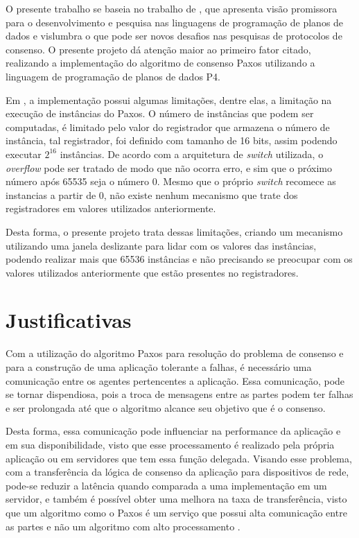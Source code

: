 \documentclass[
    12pt,
    openright, 
    oneside,
    a4paper,
    french,
    english,
    brazil
    ]{facom-ufu-abntex2}
\theoremstyle{definition}
\begin{document}
O presente trabalho se baseia no trabalho de \cite{dang2016paxos}, que apresenta visão
promissora para o desenvolvimento e pesquisa nas linguagens de programação de planos de dados 
e vislumbra o que pode ser novos desafios nas pesquisas de protocolos de consenso.
O presente projeto dá atenção maior ao primeiro fator citado, realizando a implementação do algoritmo de consenso Paxos utilizando 
a linguagem de programação de planos de dados P4. 

Em \cite{dang2016paxos}, a implementação possui algumas limitações, dentre elas, a limitação na execução de instâncias do Paxos. 
O número de instâncias que podem ser computadas, é limitado pelo valor do registrador que armazena o número de instância, tal registrador, 
foi definido com tamanho de 16 bits, assim podendo executar $2^{16}$ instâncias. De acordo com a arquitetura de \emph{switch} utilizada, 
o \emph{overflow} pode ser tratado de modo que não ocorra erro, e sim que o próximo número após 65535 seja o número 0. 
Mesmo que o próprio \emph{switch} recomece as instancias a partir de 0, não existe nenhum mecanismo que trate dos registradores em 
valores utilizados anteriormente. 

Desta forma, o presente projeto trata dessas limitações, criando um mecanismo utilizando uma
janela deslizante para lidar com os valores das instâncias, podendo realizar mais que
65536 instâncias e não precisando se preocupar com os valores utilizados anteriormente
que estão presentes no registradores.

\section{Justificativas}
Com a utilização do algoritmo Paxos para resolução do problema de consenso e para a 
construção de uma aplicação tolerante a falhas, é necessário uma comunicação entre os 
agentes pertencentes a aplicação. Essa comunicação, pode se tornar dispendiosa, pois 
a troca de mensagens entre as partes podem ter falhas e ser prolongada até que o 
algoritmo alcance seu objetivo que é o consenso.

Desta forma, essa comunicação pode influenciar na performance da aplicação e em 
sua disponibilidade, visto que esse processamento é realizado pela própria aplicação ou 
em servidores que tem essa função delegada. Visando esse problema, com a transferência
da lógica de consenso da aplicação para dispositivos de rede, pode-se reduzir a latência
quando comparada a uma implementação em um servidor, e também é possível obter uma melhora
na taxa de transferência, visto que um algoritmo como o Paxos é um serviço que possui
alta comunicação entre as partes e não um algoritmo com alto processamento
\cite{netchainRtt}.
\end{document}
